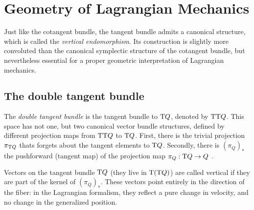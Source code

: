 \chapter{Geometry of Lagrangian Mechanics}
\label{app:symplectic_geometry}

Just like the cotangent bundle, the tangent bundle admits a canonical structure, which is called the \emph{vertical endomorphism}. Its construction is slightly more convoluted than the canonical symplectic structure of the cotangent bundle, but nevertheless essential for a proper geometric interpretation of Lagrangian mechanics. 

\section{The double tangent bundle} The \emph{double tangent bundle} is the tangent bundle to \(\mathrm{T}Q\), denoted by \(\mathrm{T}\mathrm{T}Q\). This space has not one, but two canonical vector bundle structures, defined by different projection maps from \(\mathrm{T}\mathrm{T}Q\) to \(\mathrm{T}Q\). First, there is the trivial projection \(\pi_{\mathrm{T}Q}\) thats forgets about the tangent elements to \(\mathrm{T}Q\). Secondly, there is \( (\pi_{Q})_* \) the pushforward (tangent map) of the projection map \(\pi_Q: \mathrm{T}Q \to Q\) \cite{Abraham1978}.
\begin{center}
\end{center}
Vectors on the tangent bundle \(\mathrm{T}Q\) (they live in \(\mathrm{T}(\mathrm{T}Q)\)) are called vertical if they are part of the kernel of \( (\pi_Q)_* \). These vectors point entirely in the direction of the fiber: in the Lagrangian formalism, they reflect a pure change in velocity, and no change in the generalized position. 

